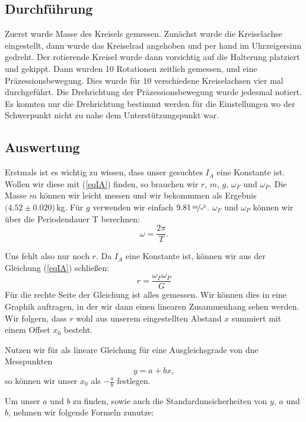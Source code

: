 \documentclass[11pt,a4paper]{article}
\begin{document}
\subsection{Durchführung}

Zuerst wurde Masse des Kreisels gemessen. Zunächst wurde die Kreiselachse eingestellt, dann wurde das Kreiselrad angehoben und per hand im Uhrzeigersinn gedreht. Der rotierende Kreisel wurde dann vorsichtig auf die Halterung platziert und gekippt. Dann wurden 10 Rotationen zeitlich gemessen, und eine Präzessionsbewegung. Dies wurde für 10 verschiedene Kreiselachsen vier mal durchgeführt. Die Drehrichtung der Präzessionsbewegung wurde jedesmal notiert. Es konnten nur die Drehrichtung bestimmt werden für die Einstellungen wo der Schwerpunkt nicht zu nahe dem Unterstützungspunkt war.

\subsection{Auswertung}

Erstmals ist es wichtig zu wissen, dass unser gesuchtes $I_A$ eine Konstante ist. Wollen wir diese mit (\ref{eqIA}) finden, so brauchen wir $r$, $m$, $g$, $\omega_F$ und $\omega_P$. Die Masse $m$ k\"onnen wir leicht messen und wir bekommmen als Ergebnis $(4.52\pm0.020$)\,kg. F\"ur $g$ verwenden wir einfach $9.81\,\nicefrac{\mathrm{m}}{\mathrm{s}^2}$. $\omega_F$ und $\omega_P$ k\"onnen wir \"uber die Periodendauer T berechnen: 
\[
\omega=\frac{2\pi}{T}.
\]

Uns fehlt also nur noch $r$. Da $I_A$ eine Konstante ist, k\"onnen wir aus der Gleichung (\ref{eqIA}) schlie\ss en:
\begin{equation}
r=\frac{\omega_F\omega_P}{G}\label{eqgraph}
\end{equation}
F\"ur die rechte Seite der Gleichung ist alles gemessen. Wir k\"onnen dies in eine Graphik auftragen, in der wir dann einen linearen Zusammenhang sehen werden. Wir folgern, dass $r$ wohl aus unserem eingestellten Abstand $x$ summiert mit einem Offset $x_0$ besteht.

Nutzen wir f\"ur als lineare Gleichung f\"ur eine Ausgleichsgrade von dne Messpunkten
\[
y=a+bx,
\]
so k\"onnen wir unser $x_0$ als $-\frac{a}{b}$ festlegen.

Um unser $a$ und $b$ zu finden, sowie auch die Standardunsicherheiten von $y$, $a$ und $b$, nehmen wir folgende Formeln zunutze:
\end{document}
